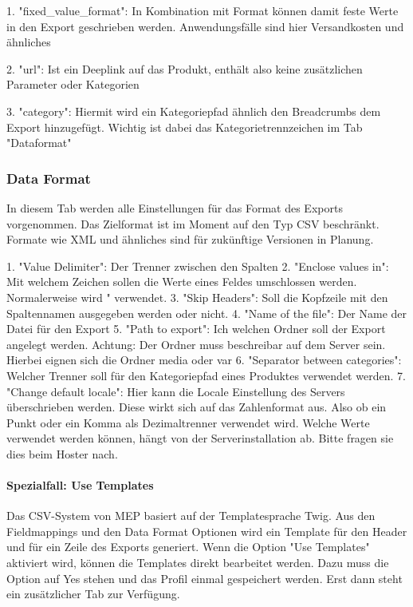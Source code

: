 \documentclass[a4paper]{article}
\begin{document}
1. "fixed\_value\_format": In Kombination mit Format können damit feste 
Werte in den Export geschrieben werden. Anwendungsfälle sind hier 
Versandkosten und ähnliches


2. "url": Ist ein Deeplink auf das Produkt, enthält also keine 
zusätzlichen Parameter oder Kategorien


3. "category": Hiermit wird ein Kategoriepfad ähnlich den Breadcrumbs 
dem Export hinzugefügt. Wichtig ist dabei das Kategorietrennzeichen im 
Tab "Dataformat"

\subsubsection{Data Format}
In diesem Tab werden alle Einstellungen für das Format des Exports 
vorgenommen. Das Zielformat ist im Moment auf den Typ CSV beschränkt. 
Formate wie XML und ähnliches sind für zukünftige Versionen in 
Planung.


1. "Value Delimiter": Der Trenner zwischen den Spalten
2. "Enclose values in": Mit welchem Zeichen sollen die Werte eines 
Feldes umschlossen werden. Normalerweise wird " verwendet.
3. "Skip Headers": Soll die Kopfzeile mit den Spaltennamen ausgegeben 
werden oder nicht.
4. "Name of the file": Der Name der Datei für den Export
5. "Path to export": Ich welchen Ordner soll der Export angelegt 
werden. Achtung: Der Ordner muss beschreibar auf dem Server sein. 
Hierbei eignen sich die Ordner media oder var
6. "Separator between categories": Welcher Trenner soll für den 
Kategoriepfad eines Produktes verwendet werden.
7. "Change default locale": Hier kann die Locale Einstellung des 
Servers überschrieben werden. Diese wirkt sich auf das Zahlenformat 
aus. Also ob ein Punkt oder ein Komma als Dezimaltrenner verwendet 
wird. Welche Werte verwendet werden können, hängt von der 
Serverinstallation ab. Bitte fragen sie dies beim Hoster nach.


\paragraph{Spezialfall: Use Templates}
Das CSV-System von MEP basiert auf der Templatesprache Twig. Aus den 
Fieldmappings und den Data Format Optionen wird ein Template für den 
Header und für ein Zeile des Exports generiert. Wenn die Option "Use 
Templates" aktiviert wird, können die Templates direkt bearbeitet 
werden. Dazu muss die Option auf Yes stehen und das Profil einmal 
gespeichert werden. Erst dann steht ein zusätzlicher Tab zur Verfügung.
\end{document}
